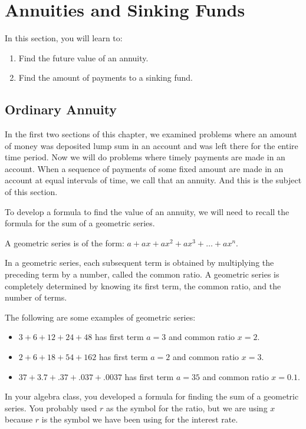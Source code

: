 \section{Annuities and Sinking Funds}

In this section, you will learn to:
\begin{enumerate}
    \item Find the future value of an annuity.
    \item Find the amount of payments to a sinking fund.
\end{enumerate}

\subsection{Ordinary Annuity}

In the first two sections of this chapter, we examined problems where an amount of money was deposited lump sum in an account and was left there for the entire time period. Now we will do problems where timely payments are made in an account. When a sequence of payments of some fixed amount are made in an account at equal intervals of time, we call that an annuity. And this is the subject of this section.

To develop a formula to find the value of an annuity, we will need to recall the formula for the sum of a geometric series.

A geometric series is of the form: $a + ax + ax^2 + ax^3 + \ldots + ax^n$.

In a geometric series, each subsequent term is obtained by multiplying the preceding term by a number, called the common ratio. A geometric series is completely determined by knowing its first term, the common ratio, and the number of terms.

The following are some examples of geometric series:
\begin{itemize}
    \item $3 + 6 + 12 + 24 + 48$ has first term $a = 3$ and common ratio $x = 2$.
    \item $2 + 6 + 18 + 54 + 162$ has first term $a = 2$ and common ratio $x = 3$.
    \item $37 + 3.7 + .37 + .037 + .0037$ has first term $a = 35$ and common ratio $x = 0.1$.
\end{itemize}

In your algebra class, you developed a formula for finding the sum of a geometric series. You probably used $r$ as the symbol for the ratio, but we are using $x$ because $r$ is the symbol we have been using for the interest rate.

